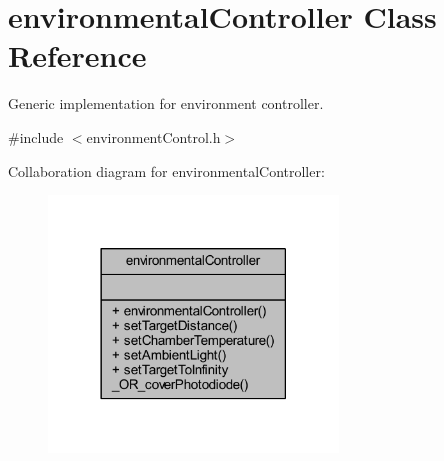 \hypertarget{classenvironmental_controller}{}\section{environmental\+Controller Class Reference}
\label{classenvironmental_controller}


Generic implementation for environment controller.  




{\ttfamily \#include $<$environment\+Control.\+h$>$}



Collaboration diagram for environmental\+Controller\+:\nopagebreak
\begin{figure}[H]
\begin{center}
\leavevmode
\includegraphics[width=218pt]{classenvironmental_controller__coll__graph}
\end{center}
\end{figure}
